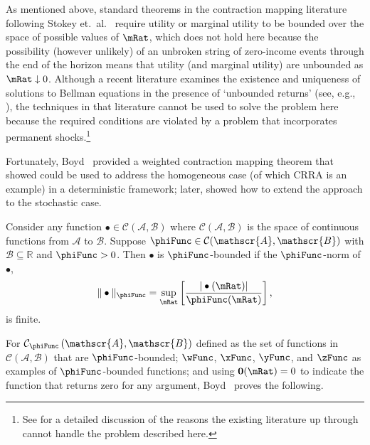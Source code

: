 \documentclass[BufferStockTheory]{subfiles}
\begin{document}
\label{subsec:contraction}

As mentioned above, standard theorems in the contraction mapping literature following Stokey et.\ al.~\citeyearpar{slpMethods} require utility or marginal utility to be bounded over the space of possible values of $\mRat$, which does not hold here because the possibility (however unlikely) of an unbroken string of zero-income events through the end of the horizon means that utility (and marginal utility) are unbounded as $\mRat \downarrow 0$.  Although a recent literature examines the existence and uniqueness of solutions to Bellman equations in the presence of `unbounded returns' (see, e.g., \cite{mnUnique}), the techniques in that literature cannot be used to solve the problem here because the required conditions are violated by a problem that incorporates permanent shocks.\footnote{See \cite{yaoNote} for a detailed discussion of the reasons the existing literature up through \cite{mnUnique} cannot handle the problem described here.}

Fortunately, Boyd~\citeyearpar{jboydWeighted} provided a weighted contraction mapping theorem that \cite{asHomogeneous} showed could be used to address the homogeneous case (of which CRRA is an example) in a deterministic framework; later, \cite{duranDiscounting} showed how to extend the \cite{jboydWeighted} approach to the stochastic case.
\begin{defn}
  Consider any function $\bullet\in \mathcal{C}(\mathscr{A},\mathscr{B})$ where $\mathcal{C}(\mathscr{A},\mathscr{B})$ is the space of continuous functions from $\mathscr{A}$ to $%
  \mathscr{B}$. Suppose $\phiFunc \in \mathcal{C}(\mathscr{A},\mathscr{B})$ with $%
  \mathscr{B}\subseteq\mathbb{R}$ and $\phiFunc >0$. Then $\bullet$ is $\phiFunc$-bounded if the $\phiFunc$-norm of $\bullet$,
  \begin{equation}
    \Vert \bullet\Vert _{\phiFunc }=\sup_{\mRat}\left[ \frac{|\bullet(\mRat)|}{\phiFunc (\mRat)}\right] ,
    \label{eq:phinorm}
  \end{equation}%
  is finite.
\end{defn}

For $\mathcal{C}_{\phiFunc }\left( \mathscr{A},\mathscr{B}\right) $
defined as the set of functions in
$\mathcal{C}(\mathscr{A},\mathscr{B})$ that are $\phiFunc$-bounded;
$\wFunc$, $\xFunc$, $\yFunc$, and $\zFunc$ as examples of
$\phiFunc$-bounded functions; and using {$\mathbf{0}(\mRat)=0$} to
indicate the function that returns zero for any argument,
Boyd~\citeyearpar{jboydWeighted} proves the following.
\end{document}
